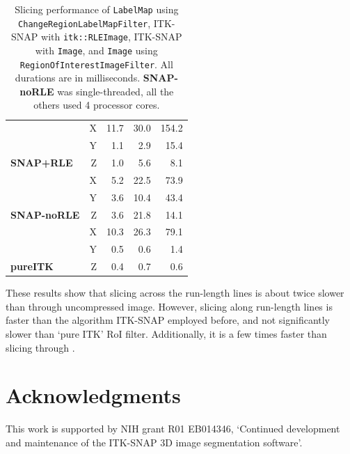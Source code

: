 \documentclass{InsightArticle}
\begin{document}
\begin{table}[ht]
\begin{tabular}{lrrrr}
    {\color[HTML]{036400} }                                      & {\color[HTML]{036400} X} & {\color[HTML]{036400} 11.7} & {\color[HTML]{036400} 30.0} & {\color[HTML]{036400} 154.2} \\
    {\color[HTML]{036400} }                                      & {\color[HTML]{036400} Y} & {\color[HTML]{036400} 1.1}  & {\color[HTML]{036400} 2.9}  & {\color[HTML]{036400} 15.4}  \\
    \multirow{-3}{*}{{\color[HTML]{036400} \textbf{SNAP+RLE}}}   & {\color[HTML]{036400} Z} & {\color[HTML]{036400} 1.0}  & {\color[HTML]{036400} 5.6}  & {\color[HTML]{036400} 8.1}   \\ \hline
    {\color[HTML]{9A0000} }                                      & {\color[HTML]{9A0000} X} & {\color[HTML]{9A0000} 5.2}  & {\color[HTML]{9A0000} 22.5} & {\color[HTML]{9A0000} 73.9}  \\
    {\color[HTML]{9A0000} }                                      & {\color[HTML]{9A0000} Y} & {\color[HTML]{9A0000} 3.6}  & {\color[HTML]{9A0000} 10.4} & {\color[HTML]{9A0000} 43.4}  \\
    \multirow{-3}{*}{{\color[HTML]{9A0000} \textbf{SNAP-noRLE}}} & {\color[HTML]{9A0000} Z} & {\color[HTML]{9A0000} 3.6}  & {\color[HTML]{9A0000} 21.8} & {\color[HTML]{9A0000} 14.1}  \\ \hline
                                                                 & X                        & 10.3                        & 26.3                        & 79.1                         \\
                                                                 & Y                        & 0.5                         & 0.6                         & 1.4                          \\
    \multirow{-3}{*}{\textbf{pureITK}}                           & Z                        & 0.4                         & 0.7                         & 0.6
    \end{tabular}
  \caption{Slicing performance of \texttt{LabelMap} using \texttt{ChangeRegionLabelMapFilter},
  ITK-SNAP with \texttt{itk::RLEImage}, ITK-SNAP with \texttt{Image},
  and \texttt{Image} using \texttt{RegionOfInterestImageFilter}. All durations are in milliseconds.
  {\color[HTML]{9A0000} \textbf{SNAP-noRLE}} was single-threaded, all the others used 4 processor cores.}
  \label{tab:slicingPerformance}
\end{table}

These results show that slicing across the run-length lines is about
twice slower than through uncompressed image.
However, slicing along run-length lines is faster than the algorithm
ITK-SNAP employed before, and not significantly slower than  `pure ITK' RoI filter.
Additionally, it is a few times faster than slicing through .

\section{Acknowledgments}

This work is supported by NIH grant R01 EB014346,
`Continued development and maintenance of the ITK-SNAP 3D image segmentation software'.



\end{document}
